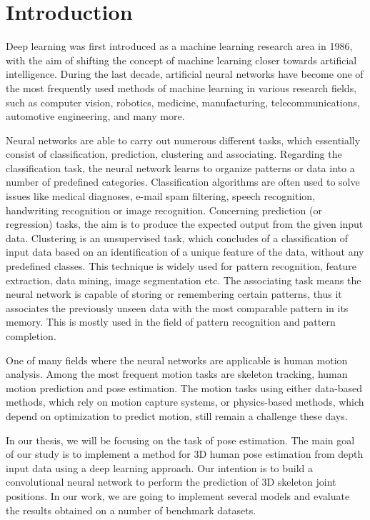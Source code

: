\chapter{Introduction}\label{chap:intro}

Deep learning was first introduced as a machine learning research area in 1986, with the aim of shifting the concept of machine learning closer towards artificial intelligence. During the last decade, artificial neural networks have become one of the most frequently used methods of machine learning in various research fields, such as computer vision, robotics, medicine, manufacturing, telecommunications, automotive engineering, and many more.\par
\vspace{5mm}
\noindent Neural networks are able to carry out numerous different tasks, which essentially consist of classification, prediction, clustering and associating. Regarding the classification task, the neural network learns to organize patterns or data into a number of predefined categories. Classification algorithms are often used to solve issues like medical diagnoses, e-mail spam filtering, speech recognition, handwriting recognition or image recognition. Concerning prediction (or regression) tasks, the aim is to produce the expected output from the given input data. Clustering is an unsupervised task, which concludes of a classification of input data based on an identification of a unique feature of the data, without any predefined classes. This technique is widely used for pattern recognition, feature extraction, data mining, image segmentation etc. The associating task means the neural network is capable of storing or remembering certain patterns, thus it associates the previously unseen data with the most comparable pattern in its memory. This is mostly used in the field of pattern recognition and pattern completion.\par
\vspace{5mm}
\noindent One of many fields where the neural networks are applicable is human motion analysis. Among the most frequent motion tasks are skeleton tracking, human motion prediction and pose estimation. The motion tasks using either data-based methods, which rely on motion capture systems, or physics-based methods, which depend on optimization to predict motion, still remain a challenge these days.
\par
\vspace{5mm}
\noindent 
In our thesis, we will be focusing on the task of pose estimation. The main goal of our study is to implement a method for 3D human pose estimation from depth input data using a deep learning approach. Our intention is to build a convolutional neural network to perform the prediction of 3D skeleton joint positions. In our work, we are going to implement several models and evaluate the results obtained on a number of benchmark datasets.\par

